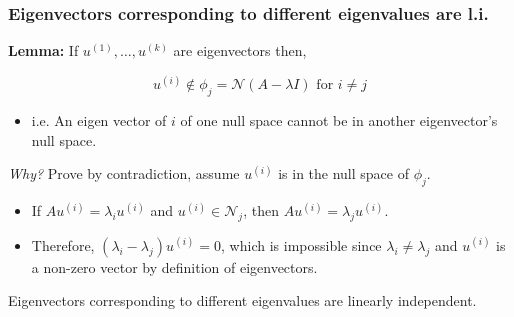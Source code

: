\subsubsection{Eigenvectors corresponding to different eigenvalues are l.i.}
\begin{theorem}
    \textbf{Lemma:} If $u^{(1)}, \ldots, u^{(k)}$ are eigenvectors then,

    \begin{equation}
        u^{(i)} \notin \phi_j = \mathcal{N}(A-\lambda I) \text{ for } i \neq j
    \end{equation} 

    \begin{itemize}
        \item i.e. An eigen vector of $i$ of one null space cannot be in another eigenvector's null space. 
    \end{itemize}
\end{theorem}

\begin{derivation}
    \textit{Why?} Prove by contradiction, assume $u^{(i)}$ is in the null space of $\phi_j$.
    \begin{itemize}
        \item If $A u^{(i)} = \lambda_i u^{(i)}$ and $u^{(i)} \in \mathcal{N}_j$, then $A u^{(i)} = \lambda_j u^{(i)}$. 
        \item Therefore, $(\lambda_i - \lambda_j) u^{(i)} = 0$, which is impossible since $\lambda_i \neq \lambda_j$ and $u^{(i)}$ is a non-zero vector by definition of eigenvectors. 
    \end{itemize}   
\end{derivation}

\begin{theorem}
    Eigenvectors corresponding to different eigenvalues are linearly independent.
\end{theorem}

